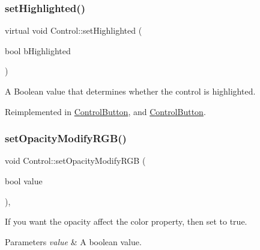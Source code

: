 \mbox{\label{classControl_a97602b469ae5f085cd604b9bf50732c3}} 
\subsubsection{\texorpdfstring{set\+Highlighted()}{setHighlighted()}\hspace{0.1cm}{\footnotesize\ttfamily [2/2]}}
{\footnotesize\ttfamily virtual void Control\+::set\+Highlighted (\begin{DoxyParamCaption}\item[{bool}]{b\+Highlighted }\end{DoxyParamCaption})\hspace{0.3cm}{\ttfamily [virtual]}}

A Boolean value that determines whether the control is highlighted. 

Reimplemented in \hyperlink{classControlButton_a534815c8b3462f04f39cfd1c2ba98645}{Control\+Button}, and \hyperlink{classControlButton_a463166812b3c42d952264855e2aa3b1d}{Control\+Button}.

\mbox{\label{classControl_ad2bebed567807e1e309513666f67ad5e}} 
\subsubsection{\texorpdfstring{set\+Opacity\+Modify\+R\+G\+B()}{setOpacityModifyRGB()}\hspace{0.1cm}{\footnotesize\ttfamily [1/2]}}
{\footnotesize\ttfamily void Control\+::set\+Opacity\+Modify\+R\+GB (\begin{DoxyParamCaption}\item[{bool}]{value }\end{DoxyParamCaption})\hspace{0.3cm}{\ttfamily [override]}, {\ttfamily [virtual]}}

If you want the opacity affect the color property, then set to true. 
\begin{DoxyParams}{Parameters}
{\em value} & A boolean value. \\
\hline
\end{DoxyParams}


